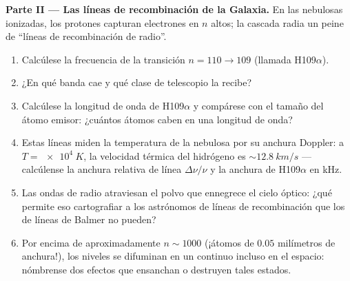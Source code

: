 \begin{problem}
\medskip\noindent\textbf{Parte II --- Las líneas de recombinación de la
Galaxia.}
En las nebulosas ionizadas, los protones capturan electrones en $n$ altos; la
cascada radia un peine de ``líneas de recombinación de radio''.
\begin{enumerate}[resume]
  \item Calcúlese la frecuencia de la transición $n = 110 \to 109$
        (llamada H109$\alpha$).
  \item ¿En qué banda cae y qué clase de telescopio la recibe?
  \item Calcúlese la longitud de onda de H109$\alpha$ y compárese con
        el tamaño del átomo emisor: ¿cuántos átomos caben en una
        longitud de onda?
  \item Estas líneas miden la temperatura de la nebulosa por su anchura
        Doppler: a $T = \qty{e4}{K}$, la velocidad térmica del hidrógeno
        es $\sim\qty{12.8}{km/s}$ --- calcúlense la anchura relativa de
        línea $\Delta\nu/\nu$ y la anchura de H109$\alpha$ en
        kHz.
  \item Las ondas de radio atraviesan el polvo que ennegrece el cielo
        óptico: ¿qué permite eso cartografiar a los astrónomos de líneas
        de recombinación que los de líneas de Balmer no pueden?
  \item Por encima de aproximadamente $n \sim 1000$ (¡átomos de $0.05$
        milímetros de anchura!), los niveles se difuminan en un continuo
        incluso en el espacio: nómbrense dos efectos que ensanchan o
        destruyen tales estados.
\end{enumerate}


\end{problem}
